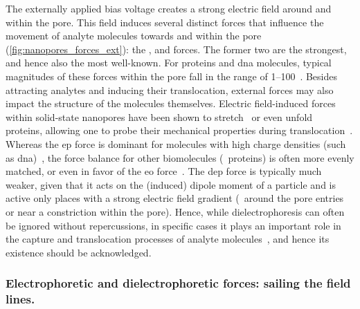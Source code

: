The externally applied bias voltage creates a strong electric field around and within the pore. This field
induces several distinct forces that influence the movement of analyte molecules towards and within the pore
(\cref{fig:nanopores_forces_ext}): the , 
and  forces. The former two are the strongest, and hence also the most
well-known. For proteins and \gls{dna} molecules, typical magnitudes of these forces within the pore fall in
the range of \SIrange{1}{100}{\pN}~\cite{Keyser-2006,vanDorp-2009}. Besides attracting analytes and inducing
their translocation, external forces may also impact the structure of the molecules themselves. Electric
field-induced forces within solid-state nanopores have been shown to stretch~\cite{Freedman-2013} or even
unfold~\cite{Freedman-2011} proteins, allowing one to probe their mechanical properties during
translocation~\cite{Waduge-2017,Zhou-2020b}. Whereas the \gls{ep} force is dominant for molecules with high
charge densities (such as \gls{dna})~\cite{vanDorp-2009}, the force balance for other biomolecules
(\eg~proteins) is often more evenly matched, or even in favor of the \gls{eo}
force~\cite{Soskine-2013,Zhang-2020}. The \gls{dep} force is typically much weaker, given that it acts on the
(induced) dipole moment of a particle and is active only places with a strong electric field gradient
(\ie~around the pore entries or near a constriction within the pore). Hence, while dielectrophoresis can often
be ignored without repercussions, in specific cases it plays an important role in the capture and
translocation processes of analyte molecules~\cite{Freedman-2016,Asandei-2016,Chinappi-2020}, and hence its
existence should be acknowledged.


\subsubsection{Electrophoretic and dielectrophoretic forces: sailing the field lines.}
%

